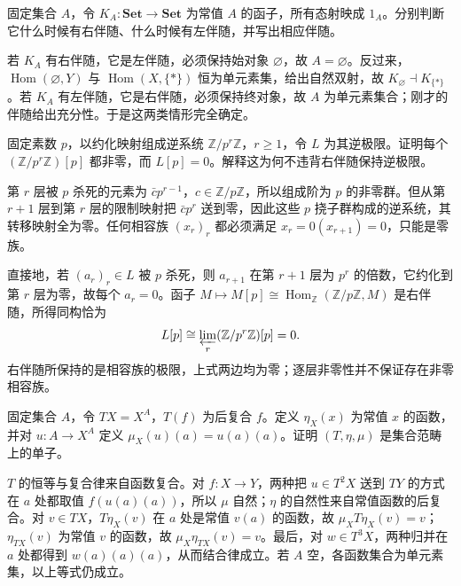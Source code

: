 \begin{exercise}\label{b4:ex:03-constant-adjoints}
	固定集合 \(A\)，令 \(K_A:\mathbf{Set}\rightarrow\mathbf{Set}\) 为常值 \(A\) 的函子，所有态射映成 \(1_A\)。分别判断它什么时候有右伴随、什么时候有左伴随，并写出相应伴随。
\end{exercise}
\begin{solution}
	若 \(K_A\) 有右伴随，它是左伴随，必须保持始对象 \(\varnothing\)，故 \(A=\varnothing\)。反过来，\(\operatorname{Hom}(\varnothing,Y)\) 与 \(\operatorname{Hom}(X,\{*\})\) 恒为单元素集，给出自然双射，故 \(K_\varnothing\dashv K_{\{*\}}\)。若 \(K_A\) 有左伴随，它是右伴随，必须保持终对象，故 \(A\) 为单元素集合；刚才的伴随给出充分性。于是这两类情形完全确定。
\end{solution}

\begin{exercise}\label{b4:ex:03-torsion-inverse-system}
	固定素数 \(p\)，以约化映射组成逆系统 \(\mathbb Z/p^r\mathbb Z\)，\(r\ge1\)，令 \(L\) 为其逆极限。证明每个 \((\mathbb Z/p^r\mathbb Z)[p]\) 都非零，而 \(L[p]=0\)。解释这为何不违背右伴随保持逆极限。
\end{exercise}
\begin{solution}
	第 \(r\) 层被 \(p\) 杀死的元素为 \(\bar c p^{r-1}\)，\(c\in\mathbb Z/p\mathbb Z\)，所以组成阶为 \(p\) 的非零群。但从第 \(r+1\) 层到第 \(r\) 层的限制映射把 \(\bar c p^r\) 送到零，因此这些 \(p\) 挠子群构成的逆系统，其转移映射全为零。任何相容族 \((x_r)_r\) 都必须满足 \(x_r=0(x_{r+1})=0\)，只能是零族。

	直接地，若 \((a_r)_r\in L\) 被 \(p\) 杀死，则 \(a_{r+1}\) 在第 \(r+1\) 层为 \(p^r\) 的倍数，它约化到第 \(r\) 层为零，故每个 \(a_r=0\)。函子 \(M\mapsto M[p]\cong\operatorname{Hom}_{\mathbb Z}(\mathbb Z/p\mathbb Z,M)\) 是右伴随，所得同构恰为
	\[
		L[p]\cong\varprojlim_r(\mathbb Z/p^r\mathbb Z)[p]=0.
	\]
	右伴随所保持的是相容族的极限，上式两边均为零；逐层非零性并不保证存在非零相容族。
\end{solution}

\begin{exercise}\label{b4:ex:03-reader-monad}
	固定集合 \(A\)，令 \(TX=X^A\)，\(T(f)\) 为后复合 \(f\)。定义 \(\eta_X(x)\) 为常值 \(x\) 的函数，并对 \(u:A\rightarrow X^A\) 定义 \(\mu_X(u)(a)=u(a)(a)\)。证明 \((T,\eta,\mu)\) 是集合范畴上的单子。
\end{exercise}
\begin{solution}
	\(T\) 的恒等与复合律来自函数复合。对 \(f:X\rightarrow Y\)，两种把 \(u\in T^2X\) 送到 \(TY\) 的方式在 \(a\) 处都取值 \(f(u(a)(a))\)，所以 \(\mu\) 自然；\(\eta\) 的自然性来自常值函数的后复合。对 \(v\in TX\)，\(T\eta_X(v)\) 在 \(a\) 处是常值 \(v(a)\) 的函数，故 \(\mu_XT\eta_X(v)=v\)；\(\eta_{TX}(v)\) 为常值 \(v\) 的函数，故 \(\mu_X\eta_{TX}(v)=v\)。最后，对 \(w\in T^3X\)，两种归并在 \(a\) 处都得到 \(w(a)(a)(a)\)，从而结合律成立。若 \(A\) 空，各函数集合为单元素集，以上等式仍成立。
\end{solution}

